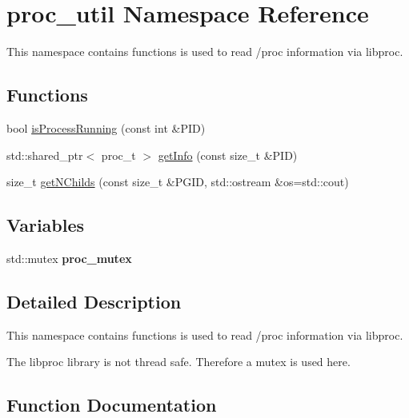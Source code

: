 \hypertarget{namespaceproc__util}{}\section{proc\+\_\+util Namespace Reference}
\label{namespaceproc__util}


This namespace contains functions is used to read /proc information via libproc.  


\subsection*{Functions}
\begin{DoxyCompactItemize}
\item 
bool \hyperlink{namespaceproc__util_a3239beea007655f5b9ca18eeae0ba8d4}{is\+Process\+Running} (const int \&P\+ID)
\item 
std\+::shared\+\_\+ptr$<$ proc\+\_\+t $>$ \hyperlink{namespaceproc__util_a82bc404af2ea091b460762103e6621e6}{get\+Info} (const size\+\_\+t \&P\+ID)
\item 
size\+\_\+t \hyperlink{namespaceproc__util_a55cf35ee280c561e235c1dd1381be6af}{get\+N\+Childs} (const size\+\_\+t \&P\+G\+ID, std\+::ostream \&os=std\+::cout)
\end{DoxyCompactItemize}
\subsection*{Variables}
\begin{DoxyCompactItemize}
\item 
std\+::mutex {\bfseries proc\+\_\+mutex}\hypertarget{namespaceproc__util_acb27922218d29cffc4a4886bdf034916}{}\label{namespaceproc__util_acb27922218d29cffc4a4886bdf034916}

\end{DoxyCompactItemize}


\subsection{Detailed Description}
This namespace contains functions is used to read /proc information via libproc. 

The libproc library is not thread safe. Therefore a mutex is used here. 

\subsection{Function Documentation}
